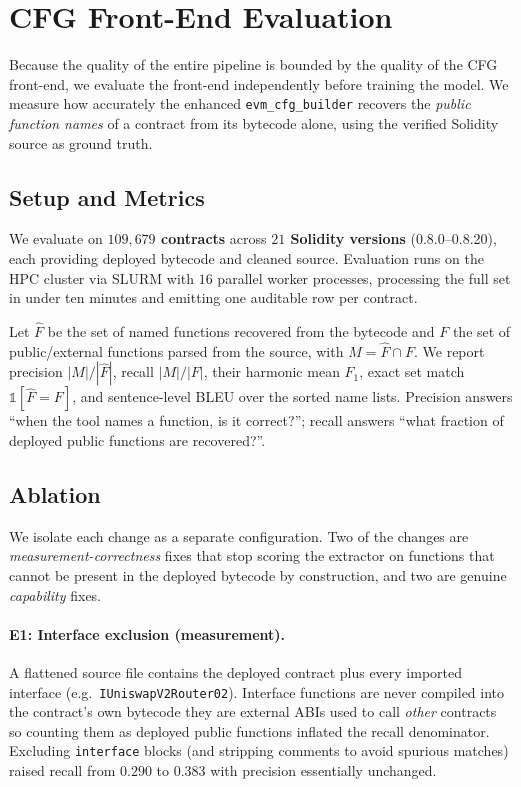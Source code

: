 \documentclass{article}
\begin{document}
\section{CFG Front-End Evaluation}
\label{sec:cfg-eval}

Because the quality of the entire pipeline is bounded by the quality of the CFG
front-end, we evaluate the front-end independently before training the model. We
measure how accurately the enhanced \texttt{evm\_cfg\_builder} recovers the
\emph{public function names} of a contract from its bytecode alone, using the
verified Solidity source as ground truth.

\subsection{Setup and Metrics}

We evaluate on \textbf{$109{,}679$ contracts} across \textbf{$21$ Solidity
versions} (0.8.0--0.8.20), each providing deployed bytecode and cleaned source.
Evaluation runs on the HPC cluster via SLURM with $16$ parallel worker processes,
processing the full set in under ten minutes and emitting one auditable row per
contract.

Let $\widehat{F}$ be the set of named functions recovered from the bytecode and
$F$ the set of public/external functions parsed from the source, with
$M=\widehat{F}\cap F$. We report precision $|M|/|\widehat{F}|$, recall $|M|/|F|$,
their harmonic mean $F_1$, exact set match $\mathbb{1}[\widehat{F}=F]$, and
sentence-level BLEU over the sorted name lists. Precision answers ``when the tool
names a function, is it correct?''; recall answers ``what fraction of deployed
public functions are recovered?''.

\subsection{Ablation}

We isolate each change as a separate configuration. Two of the changes are
\emph{measurement-correctness} fixes that stop scoring the extractor on functions
that cannot be present in the deployed bytecode by construction, and two are
genuine \emph{capability} fixes.

\paragraph{E1: Interface exclusion (measurement).}
A flattened source file contains the deployed contract plus every imported
interface (e.g.\ \texttt{IUniswapV2Router02}). Interface functions are never
compiled into the contract's own bytecode they are external ABIs used to call
\emph{other} contracts so counting them as deployed public functions inflated the
recall denominator. Excluding \texttt{interface} blocks (and stripping comments to
avoid spurious matches) raised recall from $0.290$ to $0.383$ with precision
essentially unchanged.
\end{document}
